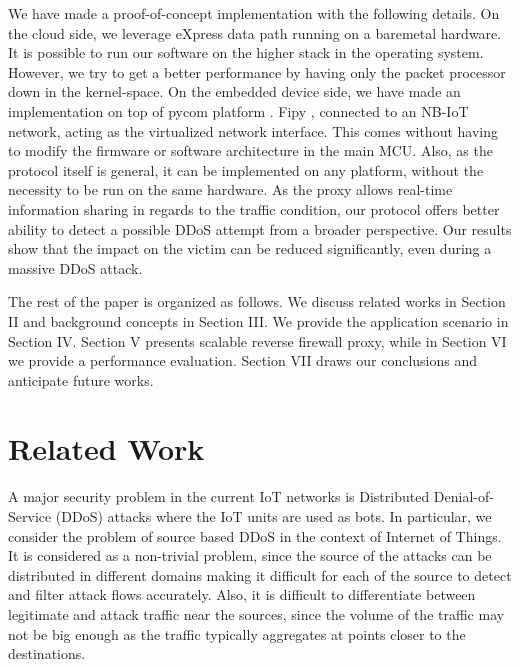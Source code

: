 \documentclass[sigplan,screen]{acmart}
\begin{document}
We have made a proof-of-concept implementation with the following details. On the cloud side, we leverage eXpress data path \cite{10.1145/3281411.3281443} running on a baremetal hardware. It is possible to run our software on the higher stack in the operating system. However, we try to get a better performance by having only the packet processor down in the kernel-space. On the embedded device side, we have made an implementation on top of pycom platform \cite{pycom}. Fipy \cite{fipy}, connected to an NB-IoT network, acting as the virtualized network interface. This comes without having to modify the firmware or software architecture in the main MCU. Also, as the protocol itself is general, it can be implemented on any platform, without the necessity to be run on the same hardware. As the proxy allows real-time information sharing in regards to the traffic condition, our protocol offers better ability to detect a possible DDoS attempt from a broader perspective. Our results show that the impact on the victim can be reduced significantly, even during a massive DDoS attack. 

The rest of the paper is organized as follows. We discuss related works in Section II and background concepts in Section III. We provide the application scenario in Section IV. Section V presents scalable reverse firewall proxy, while in Section VI we provide a performance evaluation. Section VII draws our conclusions and anticipate future works.

\section{Related Work}
A major security problem in the current IoT networks is Distributed Denial-of-Service (DDoS) attacks where the IoT units are used as bots. In particular, we consider the problem of source based DDoS in the context of Internet of Things. It is considered as a non-trivial problem, since the source of the attacks can be distributed in different domains making it difficult for each of the source to detect and filter attack flows accurately. Also, it is difficult to differentiate between legitimate and attack traffic near the sources, since the volume of the traffic may not be big enough as the traffic typically aggregates at points closer to the destinations.
\end{document}
